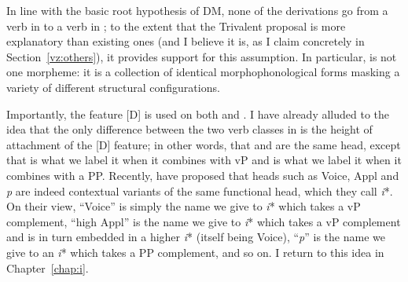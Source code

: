\begin{exe}
\begin{xlist}
\begin{xlist}
\begin{exe}
\begin{xlist}
\begin{xlist}
\begin{exe}
\begin{xlist}
\begin{xlist}
\begin{exe}
\begin{exe}
\begin{xlist}
\begin{exe}
\begin{exe}
\begin{xlist}
\begin{exe}
\begin{exe}
\begin{exe}
\begin{exe}
\begin{exe}
\begin{xlist}
\begin{exe}
\begin{xlist}
\begin{exe}
\begin{exe}
\begin{xlist}
\begin{exe}
\begin{xlist}
\begin{exe}
\begin{xlist}
\begin{exe}
\begin{exe}
\begin{exe}
\begin{xlist}
\begin{exe}
\begin{exe}
\begin{exe}
\begin{xlist}
\begin{exe}
\begin{xlist}
\begin{exe}
\begin{xlist}
\begin{exe}
\begin{xlist}
\begin{exe}
\begin{exe}
\begin{exe}
\begin{exe}
\begin{xlist}
\begin{exe}
\begin{xlist}
\begin{exe}
\begin{xlist}
\begin{exe}
\begin{xlist}
\begin{exe}
\begin{xlist}
\begin{exe}
\begin{xlist}
\begin{exe}
\begin{exe}
\begin{exe}
\begin{exe}
\begin{xlist}
\begin{exe}
\begin{xlist}
\begin{exe}
\begin{xlist}
\begin{exe}
\begin{exe}
\begin{xlist}
In line with the basic root hypothesis of DM, none of the derivations go from a verb in {\tkal} to a verb in {\tnif}; to the extent that the Trivalent proposal is more explanatory than existing ones (and I believe it is, as I claim concretely in Section~\ref{vz:others}), it provides support for this assumption. In particular, {\tnif} is not one morpheme: it is a collection of identical morphophonological forms masking a variety of different structural configurations.

Importantly, the feature [\textminus{}D] is used on both {\vz} and {\pz}. I have already alluded to the idea that the only difference between the two verb classes in {\tnif} is the height of attachment of the [\textminus{}D] feature; in other words, that {\vz} and {\pz} are the same head, except that {\vz} is what we label it when it combines with vP and {\pz} is what we label it when it combines with a PP. Recently, \cite{woodmarantz17} have proposed that heads such as Voice, Appl and \emph{p} are indeed contextual variants of the same functional head, which they call \emph{i}*. On their view, ``Voice'' is simply the name we give to \emph{i}* which takes a vP complement, ``high Appl'' is the name we give to \emph{i}* which takes a vP complement and is in turn embedded in a higher \emph{i}* (itself being Voice), ``\emph{p}'' is the name we give to an \emph{i}* which takes a PP complement, and so on. I return to this idea in Chapter~\ref{chap:i}.


\end{xlist}
\end{exe}
\end{exe}
\end{xlist}
\end{exe}
\end{xlist}
\end{exe}
\end{xlist}
\end{exe}
\end{exe}
\end{exe}
\end{exe}
\end{xlist}
\end{exe}
\end{xlist}
\end{exe}
\end{xlist}
\end{exe}
\end{xlist}
\end{exe}
\end{xlist}
\end{exe}
\end{xlist}
\end{exe}
\end{exe}
\end{exe}
\end{exe}
\end{xlist}
\end{exe}
\end{xlist}
\end{exe}
\end{xlist}
\end{exe}
\end{xlist}
\end{exe}
\end{exe}
\end{exe}
\end{xlist}
\end{exe}
\end{exe}
\end{exe}
\end{xlist}
\end{exe}
\end{xlist}
\end{exe}
\end{xlist}
\end{exe}
\end{exe}
\end{xlist}
\end{exe}
\end{xlist}
\end{exe}
\end{exe}
\end{exe}
\end{exe}
\end{exe}
\end{xlist}
\end{exe}
\end{exe}
\end{xlist}
\end{exe}
\end{exe}
\end{xlist}
\end{xlist}
\end{exe}
\end{xlist}
\end{xlist}
\end{exe}
\end{xlist}
\end{xlist}
\end{exe}
